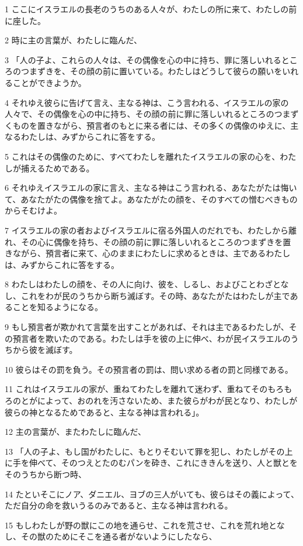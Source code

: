 \par 1 ここにイスラエルの長老のうちのある人々が、わたしの所に来て、わたしの前に座した。
\par 2 時に主の言葉が、わたしに臨んだ、
\par 3 「人の子よ、これらの人々は、その偶像を心の中に持ち、罪に落しいれるところのつまずきを、その顔の前に置いている。わたしはどうして彼らの願いをいれることができようか。
\par 4 それゆえ彼らに告げて言え、主なる神は、こう言われる、イスラエルの家の人々で、その偶像を心の中に持ち、その顔の前に罪に落しいれるところのつまずくものを置きながら、預言者のもとに来る者には、その多くの偶像のゆえに、主なるわたしは、みずからこれに答をする。
\par 5 これはその偶像のために、すべてわたしを離れたイスラエルの家の心を、わたしが捕えるためである。
\par 6 それゆえイスラエルの家に言え、主なる神はこう言われる、あなたがたは悔いて、あなたがたの偶像を捨てよ。あなたがたの顔を、そのすべての憎むべきものからそむけよ。
\par 7 イスラエルの家の者およびイスラエルに宿る外国人のだれでも、わたしから離れ、その心に偶像を持ち、その顔の前に罪に落しいれるところのつまずきを置きながら、預言者に来て、心のままにわたしに求めるときは、主であるわたしは、みずからこれに答をする。
\par 8 わたしはわたしの顔を、その人に向け、彼を、しるし、およびことわざとなし、これをわが民のうちから断ち滅ぼす。その時、あなたがたはわたしが主であることを知るようになる。
\par 9 もし預言者が欺かれて言葉を出すことがあれば、それは主であるわたしが、その預言者を欺いたのである。わたしは手を彼の上に伸べ、わが民イスラエルのうちから彼を滅ぼす。
\par 10 彼らはその罰を負う。その預言者の罰は、問い求める者の罰と同様である。
\par 11 これはイスラエルの家が、重ねてわたしを離れて迷わず、重ねてそのもろもろのとがによって、おのれを汚さないため、また彼らがわが民となり、わたしが彼らの神となるためであると、主なる神は言われる」。
\par 12 主の言葉が、またわたしに臨んだ、
\par 13 「人の子よ、もし国がわたしに、もとりそむいて罪を犯し、わたしがその上に手を伸べて、そのつえとたのむパンを砕き、これにききんを送り、人と獣とをそのうちから断つ時、
\par 14 たといそこにノア、ダニエル、ヨブの三人がいても、彼らはその義によって、ただ自分の命を救いうるのみであると、主なる神は言われる。
\par 15 もしわたしが野の獣にこの地を通らせ、これを荒させ、これを荒れ地となし、その獣のためにそこを通る者がないようにしたなら、
